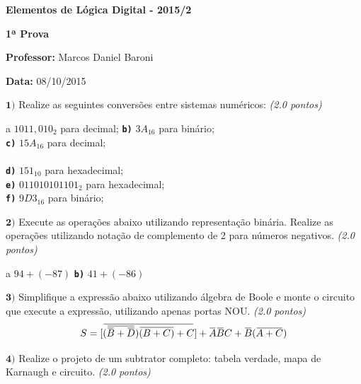 \documentclass[12pt]{article}
\newcommand{\exerc}[3]{ \vspace*{25pt} {$\mathbf{#1)}$} #2 \hfill {\it #3} }
\newcommand{\exitem}[2]{ \texttt{\bf #1)} #2 \\ }
\newcommand*\xor{\mathbin{\oplus}}
\renewcommand{\neg}[1]{ 
  \mkern 1.5mu\overline{\mkern-1.5mu#1\mkern-1.5mu}\mkern 1.5mu
}
\newenvironment{exitems}[1]{
\\
\hspace*{30pt}
\begin{minipage}{0.8\textwidth}
\begin{multicols}{#1} 
}{
\end{multicols}
\end{minipage}
}
\begin{document}

\begin{center}
{\Large \bf Elementos de Lógica Digital - 2015/2}
\end{center}

{\large \bf 1ª Prova}

{\bf Professor:} Marcos Daniel Baroni

{\bf Data:} 08/10/2015


\exerc{1}{Realize as seguintes conversões entre sistemas numéricos:}{(2.0 pontos)}
\begin{exitems}{2}
	\exitem{a}{ $1011,010_2$ para decimal;}
	\exitem{b}{ $3A_{16}$ para binário;}
	\exitem{c}{ $15A_{16}$ para decimal;}
	\\
	\exitem{d}{ $151_{10}$ para hexadecimal;}
	\exitem{e}{ $0110 1010 1101_{2}$ para hexadecimal;}
	\exitem{f}{ $9D3_{16}$ para binário;}
\end{exitems}

\exerc{2}{Execute as operações abaixo utilizando representação binária. Realize as operações utilizando notação de complemento de 2 para números negativos.}{(2.0 pontos)}
\begin{exitems}{2}
	\exitem{a}{ $94 + (-87)$}
	\exitem{b}{ $41 + (-86)$}
\end{exitems}

\exerc{3}{Simplifique a expressão abaixo utilizando álgebra de Boole e monte o circuito que execute a expressão, utilizando apenas portas NOU.}{(2.0 pontos)}
\begin{displaymath}
		S = [\neg{ (\neg{\neg{B} + \neg{D}})\neg{(B + C)}+ C}] + \neg{A}\neg{B}C + \neg{B}(\neg{A+C})
\end{displaymath}

\exerc{4}{Realize o projeto de um subtrator completo: tabela verdade, mapa de Karnaugh e circuito.}{(2.0 pontos)}
\end{document}

